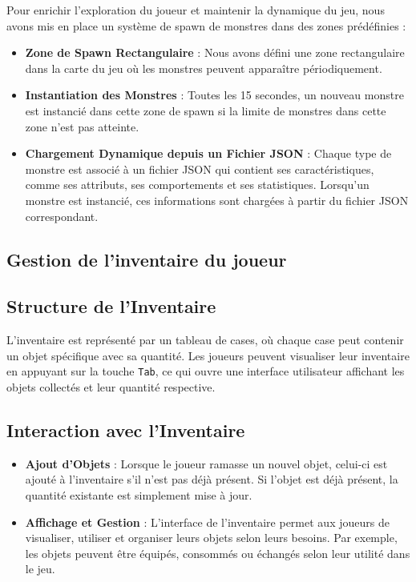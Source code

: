 Pour enrichir l'exploration du joueur et maintenir la dynamique du jeu, nous avons mis en place un système de spawn de monstres dans des zones prédéfinies :
\\

\begin{itemize}
    \item \textbf{Zone de Spawn Rectangulaire} : Nous avons défini une zone rectangulaire dans la carte du jeu où les monstres peuvent apparaître périodiquement.
    \\

    \item \textbf{Instantiation des Monstres} : Toutes les 15 secondes, un nouveau monstre est instancié dans cette zone de spawn si la limite de monstres dans
     cette zone n'est pas atteinte.
    \\

    \item \textbf{Chargement Dynamique depuis un Fichier JSON} : Chaque type de monstre est associé à un fichier 
    JSON qui contient ses caractéristiques, comme ses attributs, ses comportements et ses statistiques. Lorsqu'un monstre est instancié, 
    ces informations sont chargées à partir du fichier JSON correspondant.
\end{itemize}

\subsection{Gestion de l'inventaire du joueur }

\subsection*{Structure de l'Inventaire}

L'inventaire est représenté par un tableau de cases, où chaque case peut contenir un objet spécifique avec sa quantité. 
Les joueurs peuvent visualiser leur inventaire en appuyant sur la touche \texttt{Tab}, ce qui ouvre une interface utilisateur affichant 
les objets collectés et leur quantité respective.

\subsection*{Interaction avec l'Inventaire}

\begin{itemize}
    \item \textbf{Ajout d'Objets} : Lorsque le joueur ramasse un nouvel objet, celui-ci est ajouté à l'inventaire s'il n'est pas déjà présent. 
    Si l'objet est déjà présent, la quantité existante est simplement mise à jour.
    \\
    \item \textbf{Affichage et Gestion} : L'interface de l'inventaire permet aux joueurs de visualiser, utiliser et organiser leurs objets selon 
    leurs besoins. Par exemple, les objets peuvent être équipés, consommés ou échangés selon leur utilité dans le jeu.
\end{itemize}

